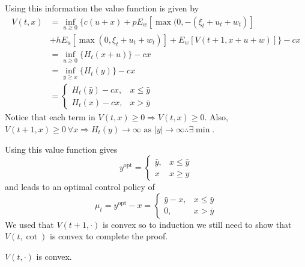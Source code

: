 Using this information the value function is given by
\begin{align*}
V(t,x) &= \inf_{u\geq 0} \{c(u+x) + pE_w[\max(0,-(\xi_t+u_t+w_t)] \\
&+ hE_u[\max(0,\xi_t+u_t+w_t)] + E_w[V(t+1,x+u+w)]\} - cx \\
&= \inf_{u\geq 0} \{H_t(x+u)\} - cx \\
&= \inf_{y\geq x}\{H_t(y)\} - cx \\
&= \begin{cases} H_t(\bar{y})-cx, & x\leq\bar{y} \\ H_t(x)-cx, & x>\bar{y} \end{cases}
\end{align*}
Notice that each term in $V(t,x)\geq 0 \Rightarrow V(t,x)\geq 0$. Also, $V(t+1,x)\geq 0 ~\forall x \Rightarrow H_t(y)\to\infty \text{ as } |y|\to\infty \therefore \exists \min$.

Using this value function gives
$$y^{\text{opt}} = \begin{cases} \bar{y}, & x\leq\bar{y} \\ x & x\geq y \end{cases}$$
and leads to an optimal control policy of
$$\mu_t = y^{\text{opt}}-x = \begin{cases} \bar{y}-x, & x\leq\bar{y} \\ 0, & x>\bar{y} \end{cases}$$
We used that $V(t+1,\cdot)$ is convex  so to induction we still need to show that $V(t,\cot)$ is convex to complete the proof.

\begin{theorem}
$V(t,\cdot)$ is convex.
\end{theorem}


